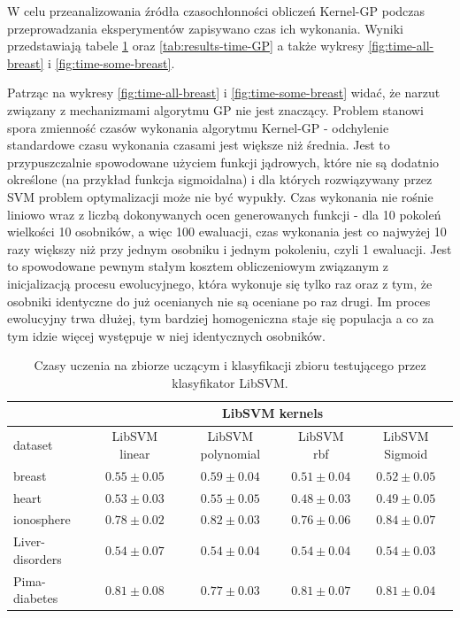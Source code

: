 W celu przeanalizowania źródła czasochłonności obliczeń Kernel-GP podczas przeprowadzania eksperymentów zapisywano czas ich wykonania. Wyniki przedstawiają tabele \ref{tab:results-time-LSVM} oraz \ref{tab:results-time-GP} a także wykresy \ref{fig:time-all-breast} i \ref{fig:time-some-breast}.

Patrząc na wykresy \ref{fig:time-all-breast} i \ref{fig:time-some-breast} widać, że narzut związany z mechanizmami algorytmu GP nie jest znaczący. Problem stanowi spora zmienność czasów wykonania algorytmu Kernel-GP - odchylenie standardowe czasu wykonania czasami jest większe niż średnia. Jest to przypuszczalnie spowodowane użyciem funkcji jądrowych, które nie są dodatnio określone (na przykład funkcja sigmoidalna) i dla których rozwiązywany przez SVM problem optymalizacji może nie być wypukły. Czas wykonania nie rośnie liniowo wraz z liczbą dokonywanych ocen generowanych funkcji - dla 10 pokoleń wielkości 10 osobników, a więc 100 ewaluacji, czas wykonania jest co najwyżej 10 razy większy niż przy jednym osobniku i jednym pokoleniu, czyli 1 ewaluacji. Jest to spowodowane pewnym stałym kosztem obliczeniowym  związanym z inicjalizacją procesu ewolucyjnego, która wykonuje się tylko raz oraz z tym, że osobniki identyczne do już ocenianych nie są oceniane po raz drugi. Im proces ewolucyjny trwa dłużej, tym bardziej homogeniczna staje się populacja a co za tym idzie więcej występuje w niej identycznych osobników.

\begin{table}[htbp]
\caption{Czasy uczenia na zbiorze uczącym i klasyfikacji zbioru testującego przez klasyfikator LibSVM.}
\begin{tabular}{|l|c|c|c|c|}
\hline
 & \multicolumn{ 4}{c|}{LibSVM kernels} \\ \hline
dataset & LibSVM linear & LibSVM polynomial & LibSVM rbf & LibSVM Sigmoid \\ \hline
breast & $ 0.55\pm 0.05 $ & $ 0.59\pm 0.04 $ & $ 0.51\pm 0.04 $ & $ 0.52\pm 0.05 $ \\ \hline
heart & $ 0.53\pm 0.03 $ & $ 0.55\pm 0.05 $ & $ 0.48\pm 0.03 $ & $ 0.49\pm 0.05 $ \\ \hline
ionosphere & $ 0.78\pm 0.02 $ & $ 0.82\pm 0.03 $ & $ 0.76\pm 0.06 $ & $ 0.84\pm 0.07 $ \\ \hline
Liver-disorders & $ 0.54\pm 0.07 $ & $ 0.54\pm 0.04 $ & $ 0.54\pm 0.04 $ & $ 0.54\pm 0.03 $ \\ \hline
Pima-diabetes & $ 0.81\pm 0.08 $ & $ 0.77\pm 0.03 $ & $ 0.81\pm 0.07 $ & $ 0.81\pm 0.04 $ \\ \hline
\end{tabular}
\label{tab:results-time-LSVM}
\end{table}


